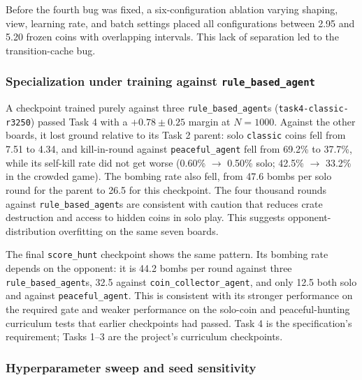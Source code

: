 \documentclass[11pt]{article}
\newcommand{\code}[1]{\texttt{#1}}
\begin{document}
Before the fourth bug was fixed, a six-configuration ablation varying shaping, view,
learning rate, and batch settings placed all configurations between 2.95 and 5.20 frozen
coins with overlapping intervals. This lack of separation led to the transition-cache bug.

\subsubsection{Specialization under training against \code{rule\_based\_agent}}

A checkpoint trained purely against three \code{rule\_based\_agent}s
(\code{task4-classic-r3250}) passed Task 4 with a $+0.78 \pm 0.25$ margin at $N{=}1000$.
Against the other boards, it lost ground relative to its Task 2 parent: solo
\code{classic} coins fell from 7.51 to 4.34, and kill-in-round against
\code{peaceful\_agent} fell from 69.2\% to 37.7\%, while its self-kill rate did not get
worse (0.60\% $\to$ 0.50\% solo; 42.5\% $\to$ 33.2\% in the crowded game). The bombing
rate also fell, from 47.6 bombs per solo round for the parent to 26.5 for this checkpoint.
The four thousand rounds against \code{rule\_based\_agent}s are consistent with caution
that reduces crate destruction and access to hidden coins in solo play. This suggests
opponent-distribution overfitting on the same seven boards.

The final \code{score\_hunt} checkpoint shows the same pattern. Its bombing rate depends on
the opponent: it is 44.2 bombs per round against three \code{rule\_based\_agent}s, 32.5
against \code{coin\_collector\_agent}, and only 12.5 both solo and against
\code{peaceful\_agent}. This is consistent with its stronger performance on the required
gate and weaker performance on the solo-coin and peaceful-hunting curriculum tests that
earlier checkpoints had passed. Task 4 is the specification's requirement; Tasks 1--3 are
the project's curriculum checkpoints.

\subsubsection{Hyperparameter sweep and seed sensitivity}
\end{document}
